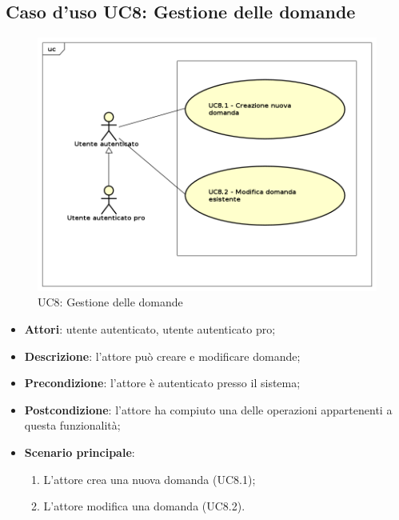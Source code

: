 \newpage
\subsection{Caso d'uso UC8: Gestione delle domande}
	\label{UC8}
	\begin{figure}[h]
		\centering
			\includegraphics[scale=0.45,keepaspectratio]{UML/UC8.png}
		\caption{UC8: Gestione delle domande}
	\end{figure}
	\FloatBarrier
	\begin{itemize}
		\item
			\textbf{Attori}: utente autenticato, utente autenticato pro;
		\item		
			\textbf{Descrizione}: l'attore può creare e modificare domande;
		\item
			\textbf{Precondizione}: l'attore è autenticato presso il sistema; 
		\item
			\textbf{Postcondizione}: l'attore ha compiuto una delle operazioni appartenenti a questa funzionalità;
		\item
			\textbf{Scenario principale}:
	       		\begin{enumerate}
					\item
					L'attore crea una nuova domanda (UC8.1);
					\item
					L'attore modifica una domanda (UC8.2).
	 			\end{enumerate}
	\end{itemize}
